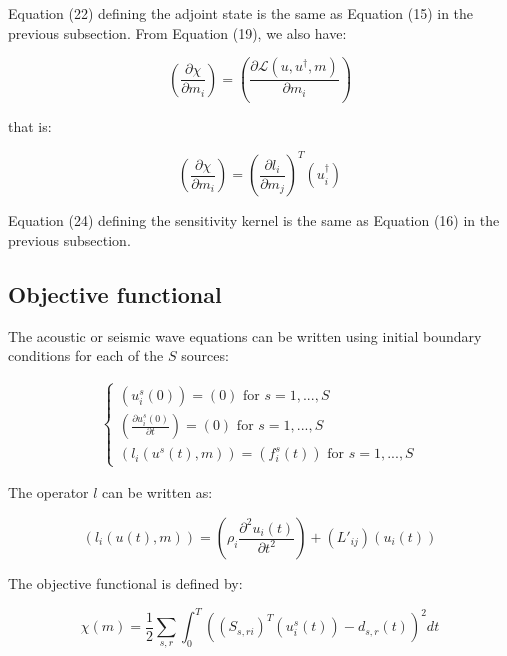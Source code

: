 \documentclass{article}
\begin{document}
Equation (22) defining the adjoint state is the same as Equation (15) in the previous subsection. From Equation (19), we also have:

\begin{equation}
	\left( \frac{\partial \chi}{\partial m_i} \right) = \left( \frac{\partial \mathscr{L} (u, u^{\dagger}, m)}{\partial m_i} \right)
\end{equation}

that is:

\begin{equation}
	\left( \frac{\partial \chi}{\partial m_i} \right) = \left( \frac{\partial l_i}{\partial m_j} \right) ^{T} \left( u_i^{\dagger} \right)
\end{equation}

Equation (24) defining the sensitivity kernel is the same as Equation (16) in the previous subsection.

\subsection{Objective functional}

The  acoustic or seismic wave equations can be written using initial boundary conditions for each of the $S$ sources:

\begin{align}
	\begin{cases}
		\left(u_i^s (0)\right) = \left( 0 \right) \text{ for } s = 1 , ... , S \\
		\left( \frac{\partial u_i^s (0)}{\partial t} \right) = \left( 0 \right) \text{ for } s = 1 , ... , S \\
		\left( l_i (u^s (t), m) \right) = \left( f_i^s (t) \right) \text{ for } s = 1 , ... , S
	\end{cases}
\end{align}

The operator $l$ can be written as:

\begin{equation}
	\left( l_i (u (t), m) \right) = \left( \rho_i \frac{\partial ^2 u_i (t)}{\partial t^2} \right) + \left( L'_{ij} \right) \left( u_i (t) \right)
\end{equation}

The objective functional is defined by:

\begin{equation}
	\chi (m) = \frac{1}{2} \sum_{s, r} \int_0^T \left( \left( S_{s, r i} \right) ^{T} \left( u_i^s (t) \right) - d_{s, r} (t) \right) ^2 dt
\end{equation}
\end{document}
